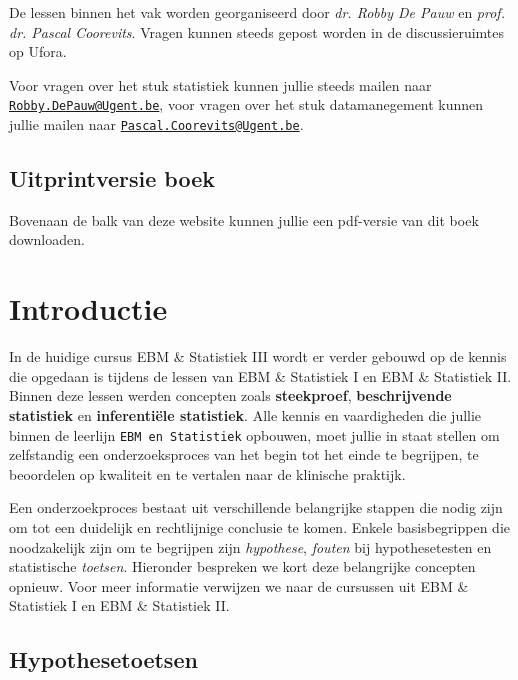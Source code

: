 \documentclass[
]{book}
\theoremstyle{definition}
\theoremstyle{definition}
\theoremstyle{definition}
\theoremstyle{definition}
\theoremstyle{remark}
\begin{document}
De lessen binnen het vak worden georganiseerd door \emph{dr. Robby De Pauw} en \emph{prof. dr. Pascal Coorevits}. Vragen kunnen steeds gepost worden in de discussieruimtes op Ufora.

Voor vragen over het stuk statistiek kunnen jullie steeds mailen naar \href{mailto:Robby.DePauw@Ugent.be}{\nolinkurl{Robby.DePauw@Ugent.be}}, voor vragen over het stuk datamanegement kunnen jullie mailen naar \href{mailto:Pascal.Coorevits@Ugent.be}{\nolinkurl{Pascal.Coorevits@Ugent.be}}.

\hypertarget{uitprintversie-boek}{%
\section*{Uitprintversie boek}\label{uitprintversie-boek}}


Bovenaan de balk van deze website kunnen jullie een pdf-versie van dit boek downloaden.

\mainmatter

\hypertarget{intro}{%
\chapter{Introductie}\label{intro}}

In de huidige cursus {EBM \& Statistiek III} wordt er verder gebouwd op de kennis die opgedaan is tijdens de lessen van {EBM \& Statistiek I} en {EBM \& Statistiek II}. Binnen deze lessen werden concepten zoals \textbf{steekproef}, \textbf{beschrijvende statistiek} en \textbf{inferentiële statistiek}. Alle kennis en vaardigheden die jullie binnen de leerlijn \texttt{EBM\ en\ Statistiek} opbouwen, moet jullie in staat stellen om zelfstandig een onderzoeksproces van het begin tot het einde te begrijpen, te beoordelen op kwaliteit en te vertalen naar de klinische praktijk.

Een onderzoekproces bestaat uit verschillende belangrijke stappen die nodig zijn om tot een duidelijk en rechtlijnige conclusie te komen. Enkele basisbegrippen die noodzakelijk zijn om te begrijpen zijn \emph{hypothese}, \emph{fouten} bij hypothesetesten en statistische \emph{toetsen}. Hieronder bespreken we kort deze belangrijke concepten opnieuw. Voor meer informatie verwijzen we naar de cursussen uit {EBM \& Statistiek I} en {EBM \& Statistiek II}.

\hypertarget{hypothesetoetsen}{%
\section*{Hypothesetoetsen}\label{hypothesetoetsen}}
\end{document}
